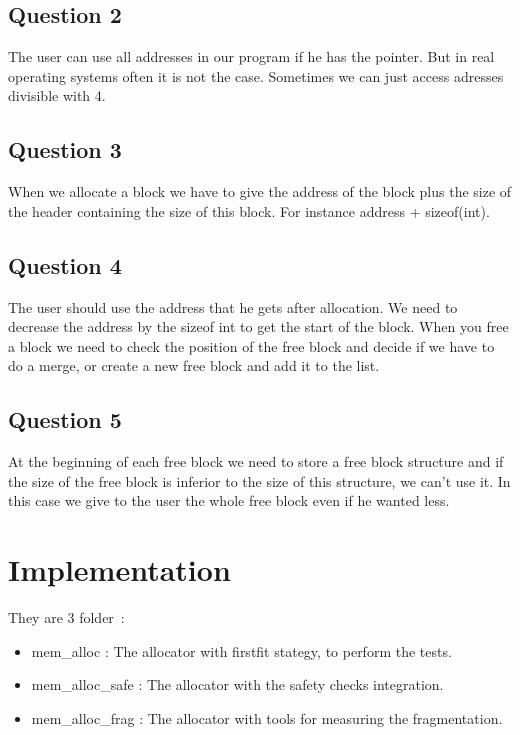\documentclass[a4paper,10pt]{article}
\begin{document}
\subsection{Question 2}
The user can use all addresses in our program if he has the pointer. But in real
operating systems often it is not the case. Sometimes we can just access
adresses divisible with 4.


\subsection{Question 3}
When we allocate a block we have to give the address of the
block plus the size of the header containing the size of this block.
For instance address + sizeof(int).

\subsection{Question 4}
The user should use the address that he gets after allocation. We need
to decrease the address by the sizeof int to get the start of the block.
When you free a block we need to check the position of the free block and decide if 
we have to do a merge, or create a new free block and add it to the list.
\subsection{Question 5}
At the beginning of each free block we need to store a free block
structure and if the size of the free block is inferior to the size 
of this structure, we can’t use it.
In this case we give to the user the whole free block even if he wanted less.


\section{Implementation}	
They are 3 folder~:
\begin{itemize}
\item mem\_alloc : The allocator with firstfit stategy, to perform the tests.
\item mem\_alloc\_safe : The allocator with the safety checks integration.
\item mem\_alloc\_frag : The allocator with tools for measuring the fragmentation.
\end{itemize}
\end{document}
